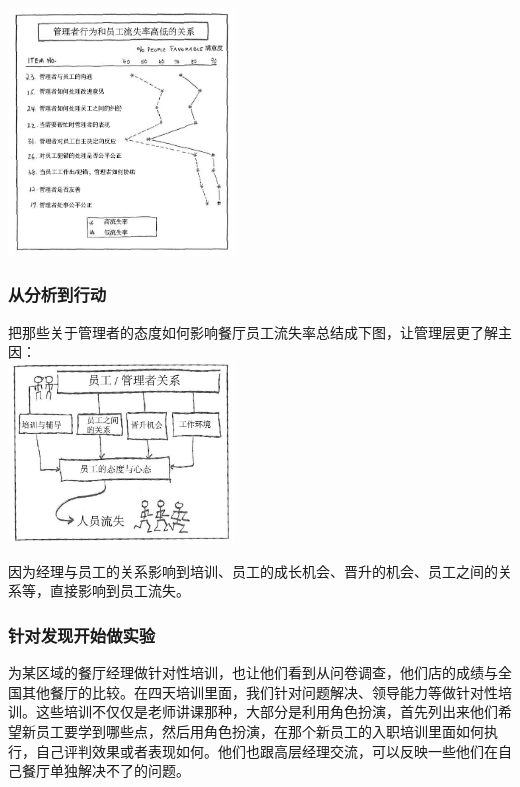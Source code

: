
\includegraphics[width=6cm]{WeisbordP2182.jpg}

\hypertarget{ux4eceux5206ux6790ux5230ux884cux52a8}{%
\subsubsection{从分析到行动}\label{ux4eceux5206ux6790ux5230ux884cux52a8}}

把那些关于管理者的态度如何影响餐厅员工流失率总结成下图，让管理层更了解主因：\\

\includegraphics[width=6cm]{WeisbordP2191.jpg}

因为经理与员工的关系影响到培训、员工的成长机会、晋升的机会、员工之间的关系等，直接影响到员工流失。

\hypertarget{ux9488ux5bf9ux53d1ux73b0ux5f00ux59cbux505aux5b9eux9a8c}{%
\subsubsection{针对发现开始做实验}\label{ux9488ux5bf9ux53d1ux73b0ux5f00ux59cbux505aux5b9eux9a8c}}

为某区域的餐厅经理做针对性培训，也让他们看到从问卷调查，他们店的成绩与全国其他餐厅的比较。在四天培训里面，我们针对问题解决、领导能力等做针对性培训。这些培训不仅仅是老师讲课那种，大部分是利用角色扮演，首先列出来他们希望新员工要学到哪些点，然后用角色扮演，在那个新员工的入职培训里面如何执行，自己评判效果或者表现如何。他们也跟高层经理交流，可以反映一些他们在自己餐厅单独解决不了的问题。

